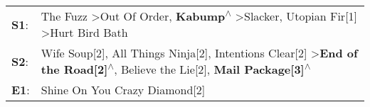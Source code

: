 \begin{supertabular}{p{0.03\textwidth}p{0.92\textwidth}}
 \textbf{S1}:  &                                   The Fuzz\textsuperscript{} \textgreater \enspace Out Of Order\textsuperscript{}, \enspace \textbf{Kabump\textsuperscript{$\wedge$}} \textgreater \enspace Slacker\textsuperscript{}, \enspace Utopian Fir[1]\textsuperscript{} \textgreater \enspace Hurt Bird Bath\textsuperscript{}  \enspace  \\
 \textbf{S2}:  &  Wife Soup[2]\textsuperscript{}, \enspace All Things Ninja[2]\textsuperscript{}, \enspace Intentions Clear[2]\textsuperscript{} \textgreater \enspace \textbf{End of the Road[2]\textsuperscript{$\wedge$}}, \enspace Believe the Lie[2]\textsuperscript{}, \enspace \textbf{Mail Package[3]\textsuperscript{$\wedge$}}  \enspace  \\
 \textbf{E1}:  &                                                                                                                                                                                                                                                                         Shine On You Crazy Diamond[2]\textsuperscript{}  \enspace  \\
\end{supertabular}
